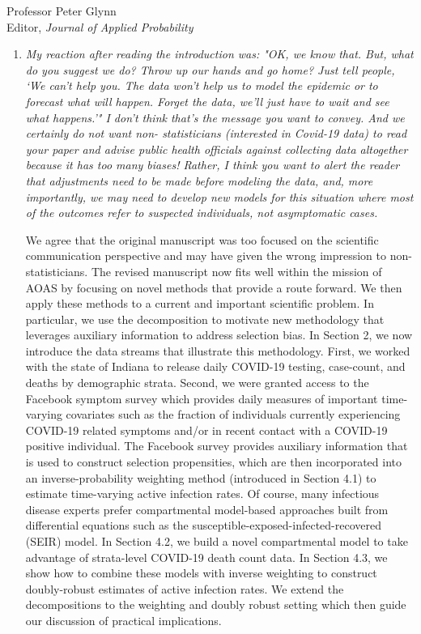 \documentclass[11pt]{letter} %
\begin{document}
\begin{letter}{Professor
	Peter Glynn\\
	Editor, {\em Journal of Applied Probability}}
\begin{enumerate}
\item {\it My reaction after reading the introduction was: "OK, we know that.
But, what do you suggest we do?  Throw up our hands and go home?
Just tell people, `We can't help you.  The data won't help us to
model the epidemic or to forecast what will happen. Forget the data,
we'll just have to wait and see what happens.'" I don't think that's
the message you want to convey.  And we certainly do not want non-
statisticians (interested in Covid-19 data) to read your paper and
advise public health officials against collecting data altogether
because it has too many biases!  Rather, I think you want to alert
the reader that adjustments need to be made before modeling the
data, and, more importantly, we may need to develop new models
for this situation where most of the outcomes refer to suspected
individuals, not asymptomatic cases.}

\vspace{5mm}
We agree that the original manuscript was too focused on the scientific communication perspective and may have given the wrong impression to non-statisticians.  The revised manuscript now fits well within the mission of AOAS by focusing on novel methods that provide a route forward.  We then apply these methods to a current and important scientific problem. In particular, we use the decomposition to motivate new methodology that leverages auxiliary information to address selection bias. In Section 2, we now introduce the data streams that illustrate this methodology. First, we worked with the state of Indiana to release daily COVID-19 testing, case-count, and deaths by demographic strata. Second, we were granted access to the Facebook symptom survey which provides daily measures of important time-varying covariates such as the fraction of individuals currently experiencing COVID-19 related symptoms and/or in recent contact with a COVID-19 positive individual.  The Facebook survey provides auxiliary information that is used to construct selection propensities, which are then incorporated into an inverse-probability weighting method (introduced in Section 4.1) to estimate time-varying active infection rates. Of course, many infectious disease experts prefer compartmental model-based approaches built from differential equations such as the susceptible-exposed-infected-recovered (SEIR) model.  In Section 4.2, we build a novel compartmental model to take advantage of strata-level COVID-19 death count data.  In Section 4.3, we show how to combine these models with inverse weighting to construct doubly-robust estimates of active infection rates.  We extend the decompositions to the weighting and doubly robust setting which then guide our discussion of practical implications.
\vspace{5mm}


\end{enumerate}
\end{letter}
\end{document}
